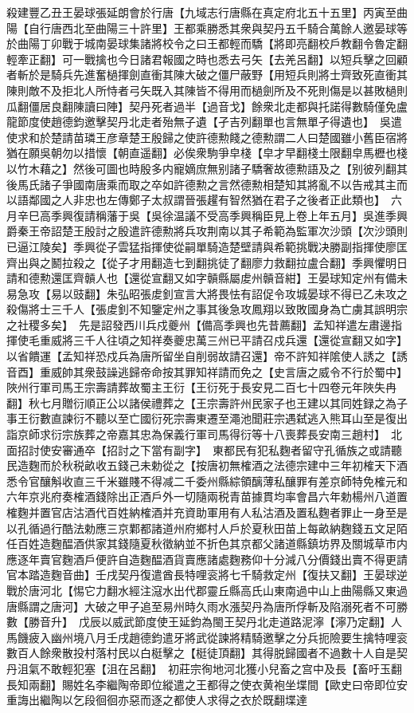 殺建豐乙丑王晏球張延朗會於行唐【九域志行唐縣在真定府北五十五里】丙寅至曲陽【自行唐西北至曲陽三十許里】王都乘勝悉其衆與契丹五千騎合萬餘人邀晏球等於曲陽丁卯戰于城南晏球集諸將校令之曰王都輕而驕【將即亮翻校戶教翻令魯定翻輕牽正翻】可一戰擒也今日諸君報國之時也悉去弓矢【去羌呂翻】以短兵擊之回顧者斬於是騎兵先進奮檛揮劍直衝其陳大破之僵尸蔽野【用短兵則將士齊致死直衝其陳則敵不及拒北人所恃者弓矢既入其陳皆不得用而檛劍所及不死則傷是以甚敗檛則瓜翻僵居良翻陳讀曰陣】契丹死者過半【過音戈】餘衆北走都與托諾得數騎僅免盧龍節度使趙德鈞邀擊契丹北走者殆無子遺【孑吉列翻單也言無單孑得遺也】　吳遣使求和於楚請苗璘王彦章楚王殷歸之使許德勲餞之德勲謂二人曰楚國雖小舊臣宿將猶在願吳朝勿以措懷【朝直遥翻】必俟衆駒爭皁棧【皁才早翻棧土限翻皁馬櫪也棧以竹木藉之】然後可圖也時殷多内寵嫡庶無别諸子驕奢故德勲語及之【别彼列翻其後馬氏諸子爭國南唐乘而取之卒如許德勲之言然德勲相楚知其將亂不以告戒其主而以語鄰國之人非忠也左傳鄭子太叔謂晉張趯有智然猶在君子之後者正此類也】　六月辛巳高季興復請稱藩于吳【吳徐温議不受高季興稱臣見上卷上年五月】吳進季興爵秦王帝詔楚王殷討之殷遣許德勲將兵攻荆南以其子希範為監軍次沙頭【次沙頭則已逼江陵矣】季興從子雲猛指揮使從嗣單騎造楚壁請與希範挑戰决勝副指揮使廖匡齊出與之鬭拉殺之【從子才用翻造七到翻挑徒了翻廖力救翻拉盧合翻】季興懼明日請和德勲還匡齊贑人也【還從宣翻又如字贑縣屬䖍州贑音紺】王晏球知定州有備未易急攻【易以豉翻】朱弘昭張䖍釗宣言大將畏怯有詔促令攻城晏球不得已乙未攻之殺傷將士三千人【張䖍釗不知鑒定州之事其後急攻鳳翔以致敗國身為亡虜其誤明宗之社稷多矣】　先是詔發西川兵戍夔州【備高季興也先昔薦翻】孟知祥遣左肅邊指揮使毛重威將三千人往頃之知祥奏夔忠萬三州已平請召戍兵還【還從宣翻又如字】以省饋運【孟知祥恐戍兵為唐所留坐自削弱故請召還】帝不許知祥隂使人誘之【誘音酉】重威帥其衆鼓譟逃歸帝命按其罪知祥請而免之【史言唐之威令不行於蜀中】　陜州行軍司馬王宗壽請葬故蜀主王衍【王衍死于長安見二百七十四卷元年陜失冉翻】秋七月贈衍順正公以諸侯禮葬之【王宗壽許州民家子也王建以其同姓録之為子事王衍數直諫衍不聽以至亡國衍死宗壽東遷至澠池聞莊宗遇弑逃入熊耳山至是復出詣京師求衍宗族葬之帝嘉其忠為保義行軍司馬得衍等十八喪葬長安南三趙村】　北面招討使安審通卒【招討之下當有副字】　東都民有犯私麴者留守孔循族之或請聽民造麴而於秋税畝收五錢己未勅從之【按唐初無榷酒之法德宗建中三年初榷天下酒悉令官釀斛收直三千米雖賤不得减二千委州縣綜領醨薄私釀罪有差京師特免榷元和六年京兆府奏榷酒錢除出正酒戶外一切隨兩税青苗據貫均率會昌六年勅楊州八道置榷麴并置官店沽酒代百姓納榷酒并充資助軍用有人私沽酒及置私麴者罪止一身至是以孔循過行酷法勅應三京鄴都諸道州府鄉村人戶於夏秋田苗上每畝納麴錢五文足陌任百姓造麴醖酒供家其錢隨夏秋徵納並不折色其京都父諸道縣鎮坊界及關城草市内應逐年賣官麴酒戶便許自造麴醖酒貨賣應諸處麴務仰十分減八分價錢出賣不得更請官本踏造麴音曲】壬戌契丹復遣酋長特哩衮將七千騎救定州【復扶又翻】王晏球逆戰於唐河北【惕它力翻水經注滱水出代郡靈丘縣高氏山東南過中山上曲陽縣又東過唐縣謂之唐河】大破之甲子追至易州時久雨水漲契丹為唐所俘斬及陷溺死者不可勝數【勝音升】　戊辰以威武節度使王延鈞為閩王契丹北走道路泥濘【濘乃定翻】人馬饑疲入幽州境八月壬戌趙德鈞遣牙將武從諫將精騎邀擊之分兵扼險要生擒特哩衮數百人餘衆散投村落村民以白梃擊之【梃徒頂翻】其得脱歸國者不過數十人自是契丹沮氣不敢輕犯塞【沮在呂翻】　初莊宗徇地河北獲小兒畜之宫中及長【畜吁玉翻長知兩翻】賜姓名李繼陶帝即位縱遣之王都得之使衣黄袍坐堞間【歐史曰帝即位安重誨出繼陶以乞段徊徊亦惡而逐之都使人求得之衣於既翻堞達
